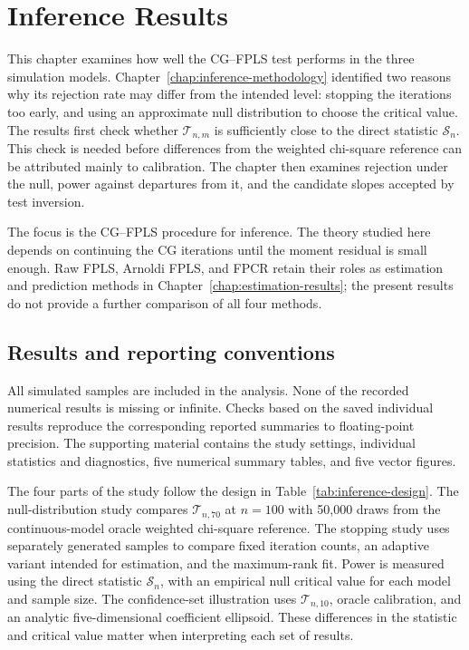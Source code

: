 \chapter{Inference Results}
\label{chap:inference-results}

This chapter examines how well the CG--FPLS test performs in the three
simulation models.  Chapter~\ref{chap:inference-methodology} identified two
reasons why its rejection rate may differ from the intended level: stopping
the iterations too early, and using an approximate null distribution to
choose the critical value.  The results first check whether
$\mathcal T_{n,m}$ is sufficiently close to the direct statistic
$\mathcal S_n$.  This check is needed before differences from the weighted
chi-square reference can be attributed mainly to calibration.  The chapter
then examines rejection under the null, power against departures from it,
and the candidate slopes accepted by test inversion.

The focus is the CG--FPLS procedure for inference.  The theory studied here
depends on continuing the CG iterations until the moment residual is small
enough.  Raw FPLS, Arnoldi FPLS, and FPCR retain their roles as estimation and
prediction methods in Chapter~\ref{chap:estimation-results}; the present
results do not provide a further comparison of all four methods.

\section{Results and reporting conventions}
\label{sec:inference-results-verification}

All simulated samples are included in the analysis.  None of the recorded
numerical results is missing or infinite.  Checks based on the saved
individual results reproduce the corresponding reported summaries to
floating-point precision.  The supporting material contains the study
settings, individual statistics and diagnostics, five numerical summary
tables, and five vector figures.

The four parts of the study follow the design in
Table~\ref{tab:inference-design}.  The null-distribution study compares
$\mathcal T_{n,70}$ at $n=100$ with 50,000 draws from the continuous-model
oracle weighted chi-square reference.  The stopping study uses separately
generated samples to compare fixed iteration counts, an adaptive variant
intended for estimation, and the maximum-rank fit.  Power is measured using
the direct statistic $\mathcal S_n$, with an empirical null critical value
for each model and sample size.  The confidence-set illustration uses
$\mathcal T_{n,10}$, oracle calibration, and an analytic five-dimensional
coefficient ellipsoid.  These differences in the statistic and critical
value matter when interpreting each set of results.

